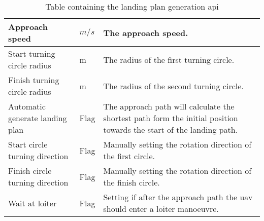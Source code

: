 \begin{table}
\begin{tabular}{| p{4cm} | p{2cm} | p{6cm} |}
Approach speed						& $m/s$			& The approach speed.	\\ \hline
Start turning circle radius			& m				& The radius of the first turning circle.	\\ \hline
Finish turning circle radius		& m				& The radius of the second turning circle.	\\ \hline
Automatic generate landing plan		& Flag			& The approach path will calculate the shortest path form the initial position towards the start of the landing path.	\\ \hline
Start circle turning direction		& Flag			& Manually setting the rotation direction of the first circle.	\\ \hline
Finish circle turning direction		& Flag			& Manually setting the rotation direction of the finish circle.	\\ \hline
Wait at loiter						& Flag			& Setting if after the approach path the \gls{uav} should enter a loiter manoeuvre.	\\ \hline
\end{tabular}
\caption{Table containing the landing plan generation \gls{api}}
\end{table}